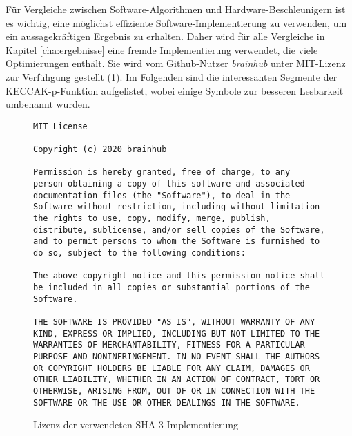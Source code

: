 Für Vergleiche zwischen Software-Algorithmen und Hardware-Beschleunigern ist es wichtig, eine möglichst effiziente Software-Implementierung zu verwenden,
um ein aussagekräftigen Ergebnis zu erhalten. Daher wird für alle Vergleiche in Kapitel \ref{cha:ergebnisse} eine fremde Implementierung verwendet,
die viele Optimierungen enthält. Sie wird vom Github-Nutzer \textit{brainhub} \cite{sha3-impl} unter MIT-Lizenz zur Verfühgung gestellt (\ref{fig:keccak_impl_license}).
Im Folgenden sind die interessanten Segmente der KECCAK-p-Funktion aufgelistet, wobei einige Symbole zur besseren Lesbarkeit umbenannt wurden.

\begin{figure}
\lstset{xleftmargin=2em}
\lstset{language=C}
\begin{lstlisting}[label={lst:keccak_impl_license}]
MIT License

Copyright (c) 2020 brainhub

Permission is hereby granted, free of charge, to any
person obtaining a copy of this software and associated
documentation files (the "Software"), to deal in the
Software without restriction, including without limitation
the rights to use, copy, modify, merge, publish,
distribute, sublicense, and/or sell copies of the Software,
and to permit persons to whom the Software is furnished to
do so, subject to the following conditions:

The above copyright notice and this permission notice shall
be included in all copies or substantial portions of the
Software.

THE SOFTWARE IS PROVIDED "AS IS", WITHOUT WARRANTY OF ANY
KIND, EXPRESS OR IMPLIED, INCLUDING BUT NOT LIMITED TO THE
WARRANTIES OF MERCHANTABILITY, FITNESS FOR A PARTICULAR
PURPOSE AND NONINFRINGEMENT. IN NO EVENT SHALL THE AUTHORS
OR COPYRIGHT HOLDERS BE LIABLE FOR ANY CLAIM, DAMAGES OR
OTHER LIABILITY, WHETHER IN AN ACTION OF CONTRACT, TORT OR
OTHERWISE, ARISING FROM, OUT OF OR IN CONNECTION WITH THE
SOFTWARE OR THE USE OR OTHER DEALINGS IN THE SOFTWARE.
\end{lstlisting}
\caption{Lizenz der verwendeten SHA-3-Implementierung}
\label{fig:keccak_impl_license}
\end{figure}

